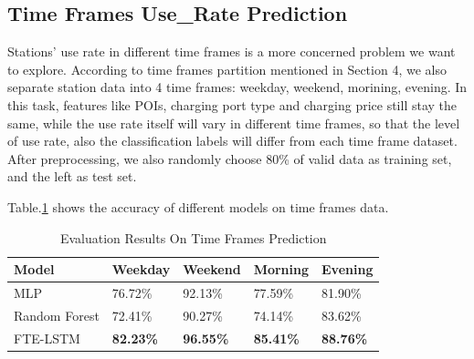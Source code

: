 \documentclass[runningheads]{llncs}
\begin{document}
\subsection{Time Frames Use\_Rate Prediction}
Stations' use rate in different time frames is a more concerned problem we want to explore. According to time frames partition mentioned in Section 4, we also separate station data into 4 time frames: weekday, weekend, morining, evening. In this task, features like POIs, charging port type and charging price still stay the same, while the use rate itself will vary in different time frames, so that the level of use rate, also the classification labels will differ from each time frame dataset. After preprocessing, we also randomly choose 80\% of valid data as training set, and the left as test set.

Table.\ref{tab4} shows the accuracy of different models on time frames data. 
\begin{table}[htbp]
	\caption{Evaluation Results On Time Frames Prediction}
	\begin{center}
		\begin{tabular}{|l|l|l|l|l|}
			\hline
			Model & Weekday & Weekend & Morning & Evening\\
			\hline
			MLP & 76.72\% & 92.13\% & 77.59\% & 81.90\%\\
			\hline
			Random Forest & 72.41\% & 90.27\% & 74.14\% & 83.62\%\\
			\hline
			FTE-LSTM & \textbf{82.23\%} & \textbf{96.55\%} & \textbf{85.41\%} & \textbf{88.76\%}\\
			\hline
		\end{tabular}
		\label{tab4}
	\end{center}
\end{table}
\end{document}
